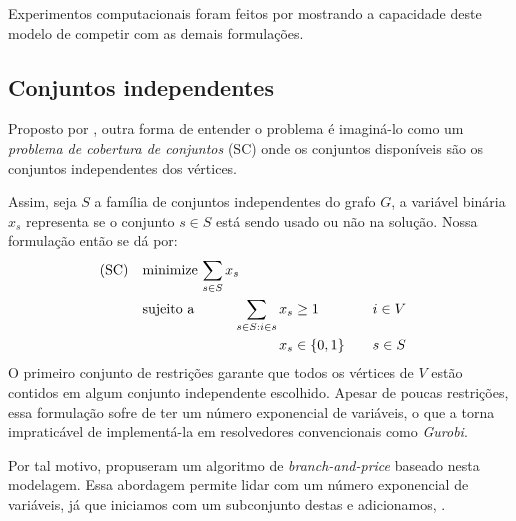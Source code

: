 \documentclass[11pt]{article}
\providecommand{\DIFaddtex}[1]{{\protect\color{blue}{#1}}} %
\providecommand{\DIFaddbegin}{} %
\providecommand{\DIFaddend}{} %
\providecommand{\DIFadd}[1]{\texorpdfstring{\DIFaddtex{#1}}{#1}} %
\newcommand{\DIFaddincludegraphics}[2][]{{\color{blue}\fbox{\DIFOincludegraphics[#1]{#2}}}} %
\DeclareRobustCommand{\DIFaddbegin}{\DIFOaddbegin \let\includegraphics\DIFaddincludegraphics} %
\DeclareRobustCommand{\DIFaddend}{\DIFOaddend \let\includegraphics\DIFOincludegraphics} %
\begin{document}
Experimentos computacionais foram feitos por \textcite{Jabrayilov2018NewIntegerLinear} mostrando a capacidade deste modelo de competir com as demais formulações.

\subsection{Conjuntos independentes}
 \DIFaddbegin \label{sec:orgd83cdd5}
\DIFaddend \label{conjuntos_independentes}
Proposto por \textcite{Mehrotra1996ColumnGenerationApproach}, outra forma de entender o problema é imaginá-lo como um \emph{problema de cobertura de conjuntos} (SC) onde os conjuntos disponíveis são os conjuntos independentes dos vértices.
\DIFaddbegin \DIFadd{Nesta classe de problemas, desejamos escolher o menor número de conjuntos tais que todos os elementos apareçam ao menos uma vez em cada um deles.
}\DIFaddend 

Assim, seja \(S\) a família de conjuntos independentes do grafo \(G\), a variável binária \(x_s\) representa se o conjunto \(s \in S\) está sendo usado ou não na solução.
Nossa formulação então se dá por:
\begin{alignat}{4}
\mathrm{(SC)} \quad & \omit\rlap{minimize  $\displaystyle \sum_{s \in S} x_s$} \nonumber \\
& \mbox{sujeito a}&& \quad & \sum_{s \in S: i \in s} x_{s}&\geq 1 & \quad & i \in V \label{rest9} \\
&                 &&   & x_s       & \in \{0,1\} &    & s \in S \nonumber
\end{alignat}
O primeiro conjunto de restrições garante que todos os vértices de \(V\) estão contidos em algum conjunto independente escolhido.
Apesar de poucas restrições, essa formulação sofre de ter um número exponencial de variáveis, o que a torna impraticável de implementá-la em resolvedores convencionais como \emph{Gurobi}.

Por tal motivo, \textcite{Mehrotra1996ColumnGenerationApproach} propuseram um algoritmo de \emph{branch-and-price} baseado nesta modelagem.
Essa abordagem permite lidar com um número exponencial de variáveis, já que iniciamos com um subconjunto destas e adicionamos,  \DIFaddbegin \DIFadd{iterativamente, aquelas necessárias}\DIFaddend .
\end{document}

